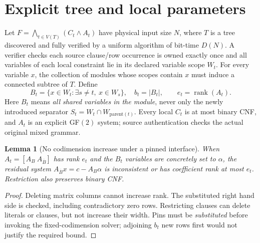 \documentclass[11pt]{article}
\newtheorem{lemma}[theorem]{Lemma}
\begin{document}
\section{Explicit tree and local parameters}
Let $F=\bigwedge_{t\in V(T)}(C_t\land A_t)$ have physical
input size $N$, where $T$ is a tree discovered and fully verified by
a uniform algorithm of bit-time $D(N)$. A verifier checks each source
clause/row occurrence is owned exactly once and all variables of each
local constraint lie in its declared variable scope $W_t$.
For every variable $x$, the collection of modules whose scopes contain
$x$ must induce a connected subtree of $T$. Define
\[
 B_t=\{x\in W_t:\exists s\ne t,\ x\in W_s\},\quad
 b_t=|B_t|,\qquad e_t=\operatorname{rank}(A_t).
\]
Here $B_t$ means \emph{all shared variables in the module}, never only
the newly introduced separator $S_t=W_t\cap W_{\mathrm{parent}(t)}$.
Every local $C_t$ is at most binary CNF, and $A_t$ is an explicit GF$(2)$
system; source authentication checks the actual original mixed grammar.

\begin{lemma}[No codimension increase under a pinned interface]
When $A_t=[A_B\ A_{\overline B}]$ has rank $e_t$ and the $B_t$
variables are concretely set to $\alpha$, the residual system
$A_{\overline B}x=c-A_B\alpha$ is inconsistent or has coefficient
rank at most $e_t$. Restriction also preserves binary CNF.
\end{lemma}
\begin{proof}
Deleting matrix columns cannot increase rank.
The substituted right hand side is checked, including contradictory
zero rows. Restricting clauses can delete literals or clauses, but not
increase their width. Pins must be \emph{substituted} before invoking
the fixed-codimension solver; adjoining $b_t$ new rows first would
not justify the required bound.
\end{proof}
\end{document}
